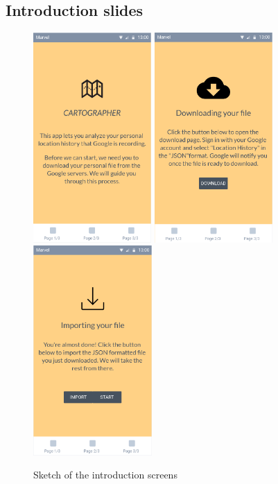\documentclass[12p]{article}
\begin{document}
	\subsection{Introduction slides}
    \begin{figure}[ht]
        \includegraphics[height=8cm,keepaspectratio]{pics/app_design/intro.PNG}
		\includegraphics[height=8cm,keepaspectratio]{pics/app_design/intro2.PNG}
		\includegraphics[height=8cm,keepaspectratio]{pics/app_design/intro3.PNG}
	    \caption{Sketch of the introduction screens}
    \end{figure}
    
\end{document}
